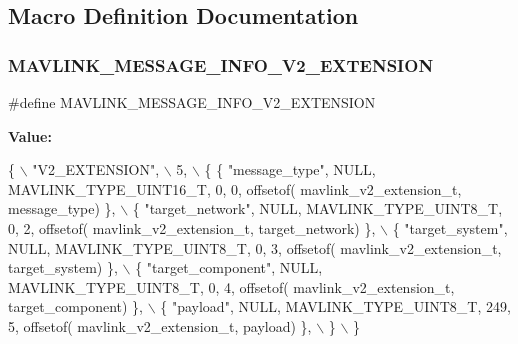 \subsection{Macro Definition Documentation}
\mbox{\label{mavlink__msg__v2__extension_8h_a26ebbee02aba017212d40fcf76eaf189}} 
\subsubsection{M\+A\+V\+L\+I\+N\+K\+\_\+\+M\+E\+S\+S\+A\+G\+E\+\_\+\+I\+N\+F\+O\+\_\+\+V2\+\_\+\+E\+X\+T\+E\+N\+S\+I\+ON}
{\footnotesize\ttfamily \#define M\+A\+V\+L\+I\+N\+K\+\_\+\+M\+E\+S\+S\+A\+G\+E\+\_\+\+I\+N\+F\+O\+\_\+\+V2\+\_\+\+E\+X\+T\+E\+N\+S\+I\+ON}

{\bfseries Value\+:}
\begin{DoxyCode}
\{ \(\backslash\)
    \textcolor{stringliteral}{"V2\_EXTENSION"}, \(\backslash\)
    5, \(\backslash\)
    \{  \{ \textcolor{stringliteral}{"message\_type"}, NULL, MAVLINK_TYPE_UINT16_T, 0, 0, offsetof(
      mavlink_v2_extension_t, message\_type) \}, \(\backslash\)
         \{ \textcolor{stringliteral}{"target\_network"}, NULL, MAVLINK_TYPE_UINT8_T, 0, 2, offsetof(
      mavlink_v2_extension_t, target\_network) \}, \(\backslash\)
         \{ \textcolor{stringliteral}{"target\_system"}, NULL, MAVLINK_TYPE_UINT8_T, 0, 3, offsetof(
      mavlink_v2_extension_t, target\_system) \}, \(\backslash\)
         \{ \textcolor{stringliteral}{"target\_component"}, NULL, MAVLINK_TYPE_UINT8_T, 0, 4, offsetof(
      mavlink_v2_extension_t, target\_component) \}, \(\backslash\)
         \{ \textcolor{stringliteral}{"payload"}, NULL, MAVLINK_TYPE_UINT8_T, 249, 5, offsetof(
      mavlink_v2_extension_t, payload) \}, \(\backslash\)
         \} \(\backslash\)
\}
\end{DoxyCode}
\mbox{\label{mavlink__msg__v2__extension_8h_a98d744b47523531e0a25dd93d498461d}} 
